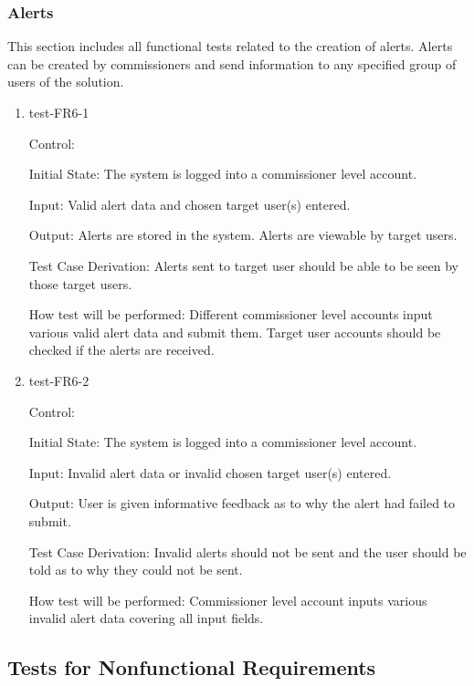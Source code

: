 \documentclass[12pt, titlepage]{article}
\begin{document}
\subsubsection{Alerts}

This section includes all functional tests related to the creation of alerts.
Alerts can be created by commissioners and send information to any specified
group of users of the solution.

\begin{enumerate}

  \item{test-FR6-1\\}

  Control: 

  Initial State: The system is logged into a commissioner level account.

  Input: Valid alert data and chosen target user(s) entered.

  Output: Alerts are stored in the system. Alerts are viewable by target users.

  Test Case Derivation: Alerts sent to target user should be able to be 
  seen by those target users.

  How test will be performed: Different commissioner level accounts input
  various valid alert data and submit them. Target user accounts should be checked
  if the alerts are received.

  \item{test-FR6-2\\}

  Control: 

  Initial State: The system is logged into a commissioner level account.

  Input: Invalid alert data or invalid chosen target user(s) entered.

  Output: User is given informative feedback as to why the alert had failed to submit.

  Test Case Derivation: Invalid alerts should not be sent and the user should
  be told as to why they could not be sent.

  How test will be performed: Commissioner level account inputs various invalid
  alert data covering all input fields.

\end{enumerate}

\subsection{Tests for Nonfunctional Requirements}
\end{document}
